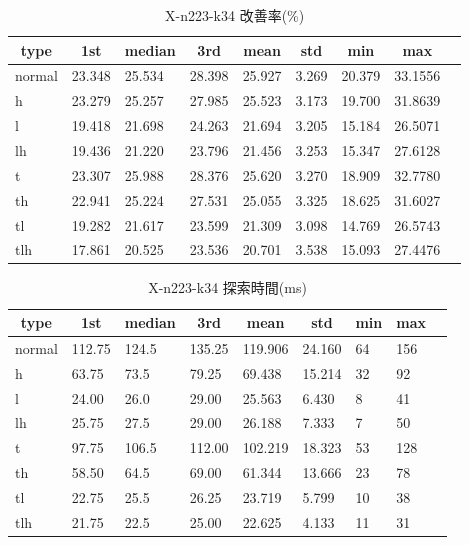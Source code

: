 \begin{table}[htbp]
    \caption{X-n223-k34 改善率(\%)}
    \begin{tabular}{|l|l|l|l|l|l|l|l|l|}\hline
    \multicolumn{1}{|c|}{\textbf{type}}
    &\multicolumn{1}{|c|}{\textbf{1st}}
    &\multicolumn{1}{c|}{\textbf{median}}
    &\multicolumn{1}{c|}{\textbf{3rd}}
    &\multicolumn{1}{c|}{\textbf{mean}}
    &\multicolumn{1}{c|}{\textbf{std}}
    &\multicolumn{1}{c|}{\textbf{min}}
    &\multicolumn{1}{c|}{\textbf{max}}\\\hline
	normal & 23.348 & 25.534 & 28.398 & 25.927 & 3.269 & 20.379 & 33.1556\\\hline
	h & 23.279 & 25.257 & 27.985 & 25.523 & 3.173 & 19.700 & 31.8639\\\hline
	l & 19.418 & 21.698 & 24.263 & 21.694 & 3.205 & 15.184 & 26.5071\\\hline
	lh & 19.436 & 21.220 & 23.796 & 21.456 & 3.253 & 15.347 & 27.6128\\\hline
	t & 23.307 & 25.988 & 28.376 & 25.620 & 3.270 & 18.909 & 32.7780\\\hline
	th & 22.941 & 25.224 & 27.531 & 25.055 & 3.325 & 18.625 & 31.6027\\\hline
	tl & 19.282 & 21.617 & 23.599 & 21.309 & 3.098 & 14.769 & 26.5743\\\hline
	tlh & 17.861 & 20.525 & 23.536 & 20.701 & 3.538 & 15.093 & 27.4476\\\hline
	\end{tabular}
\end{table}
\begin{table}[htbp]
    \caption{X-n223-k34 探索時間(ms)}
    \begin{tabular}{|l|l|l|l|l|l|l|l|l|}\hline
    \multicolumn{1}{|c|}{\textbf{type}}
    &\multicolumn{1}{|c|}{\textbf{1st}}
    &\multicolumn{1}{c|}{\textbf{median}}
    &\multicolumn{1}{c|}{\textbf{3rd}}
    &\multicolumn{1}{c|}{\textbf{mean}}
    &\multicolumn{1}{c|}{\textbf{std}}
    &\multicolumn{1}{c|}{\textbf{min}}
    &\multicolumn{1}{c|}{\textbf{max}}\\\hline
	normal & 112.75 & 124.5 & 135.25 & 119.906 & 24.160 & 64 & 156\\\hline
	h & 63.75 & 73.5 & 79.25 & 69.438 & 15.214 & 32 & 92\\\hline
	l & 24.00 & 26.0 & 29.00 & 25.563 & 6.430 & 8 & 41\\\hline
	lh & 25.75 & 27.5 & 29.00 & 26.188 & 7.333 & 7 & 50\\\hline
	t & 97.75 & 106.5 & 112.00 & 102.219 & 18.323 & 53 & 128\\\hline
	th & 58.50 & 64.5 & 69.00 & 61.344 & 13.666 & 23 & 78\\\hline
	tl & 22.75 & 25.5 & 26.25 & 23.719 & 5.799 & 10 & 38\\\hline
	tlh & 21.75 & 22.5 & 25.00 & 22.625 & 4.133 & 11 & 31\\\hline
	\end{tabular}
\end{table}
